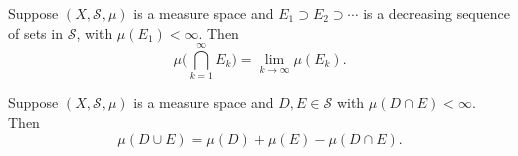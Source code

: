\begin{prop}
    Suppose \( (X,\mathcal{S}, \mu) \) is a measure space and \( {E}_{1} \supset {E}_{2} \supset \cdots \) is a decreasing sequence of sets in \( \mathcal{S} \), with \( \mu({E}_{1}) < \infty  \). Then
    \[  \mu \Big(  \bigcap_{ k =1  }^{ \infty  }  {E}_{k} \Big) = \lim_{ k  \to  \infty  }  \mu({E}_{k}). \]
\end{prop}

\begin{prop}
    Suppose \( (X,\mathcal{S}, \mu)  \) is a measure space and \( D,E \in \mathcal{S} \) with \( \mu(D \cap E) < \infty  \). Then 
    \[  \mu(D \cup E) = \mu(D) + \mu(E) - \mu(D \cap E). \]
\end{prop}
